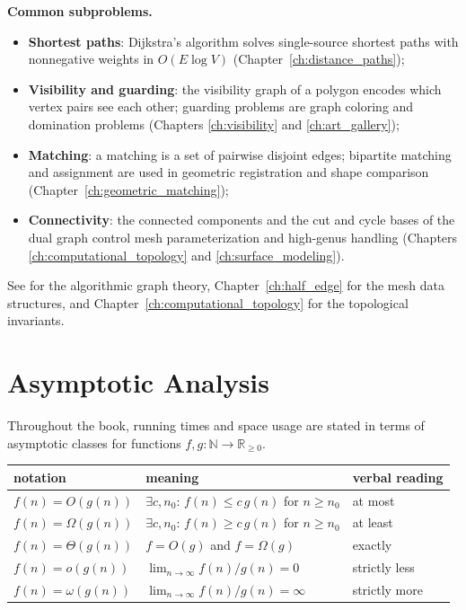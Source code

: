 \medskip
\noindent\textbf{Common subproblems.}
\begin{itemize}
  \item \textbf{Shortest paths}: Dijkstra's algorithm solves single-source
    shortest paths with nonnegative weights in $O(E \log V)$
    (Chapter~\ref{ch:distance_paths});
  \item \textbf{Visibility and guarding}: the visibility graph of a polygon
    encodes which vertex pairs see each other; guarding problems are graph
    coloring and domination problems (Chapters \ref{ch:visibility} and
    \ref{ch:art_gallery});
  \item \textbf{Matching}: a matching is a set of pairwise disjoint edges;
    bipartite matching and assignment are used in geometric registration and
    shape comparison (Chapter~\ref{ch:geometric_matching});
  \item \textbf{Connectivity}: the connected components and the cut and
    cycle bases of the dual graph control mesh parameterization and
    high-genus handling (Chapters \ref{ch:computational_topology} and
    \ref{ch:surface_modeling}).
\end{itemize}

See \cite{cormen2009} for the algorithmic graph theory,
Chapter~\ref{ch:half_edge} for the mesh data structures, and
Chapter~\ref{ch:computational_topology} for the topological invariants.

\section{Asymptotic Analysis}
\label{sec:app_math_asymptotics}

Throughout the book, running times and space usage are stated in terms of
asymptotic classes for functions $f, g : \mathbb{N} \to \mathbb{R}_{\ge 0}$.

\begin{center}
\begin{tabular}{lll}
\toprule
notation & meaning & verbal reading \\
\midrule
$f(n) = O(g(n))$ & $\exists c, n_0$: $f(n) \le c\,g(n)$ for $n \ge n_0$ & at most \\
$f(n) = \Omega(g(n))$ & $\exists c, n_0$: $f(n) \ge c\,g(n)$ for $n \ge n_0$ & at least \\
$f(n) = \Theta(g(n))$ & $f = O(g)$ and $f = \Omega(g)$ & exactly \\
$f(n) = o(g(n))$ & $\lim_{n\to\infty} f(n)/g(n) = 0$ & strictly less \\
$f(n) = \omega(g(n))$ & $\lim_{n\to\infty} f(n)/g(n) = \infty$ & strictly more \\
\bottomrule
\end{tabular}
\end{center}

